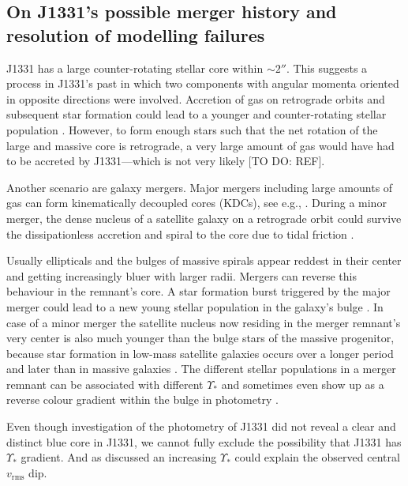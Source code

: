 \subsection{On J1331's possible merger history and resolution of modelling failures}

J1331 has a large counter-rotating stellar core within $\sim 2''$. This suggests a process in J1331's past in which two components with angular momenta oriented in opposite directions were involved. Accretion of gas on retrograde orbits and subsequent star formation could lead to a younger and counter-rotating stellar population \Wilma{[TO DO: REF]}. However, to form enough stars such that the net rotation of the large and massive core is retrograde, a very large amount of gas would have had to be accreted by J1331---which is not very likely [TO DO: REF]. 

Another scenario are galaxy mergers. Major mergers including large amounts of gas can form kinematically decoupled cores (KDCs), see e.g., . During a minor merger, the dense nucleus of a satellite galaxy on a retrograde orbit could survive the dissipationless accretion and spiral to the core due to tidal friction \citep{1984ApJ...287..577K}. 

Usually ellipticals and the bulges of massive spirals appear reddest in their center and getting increasingly bluer with larger radii. Mergers can reverse this behaviour in the remnant's core. A star formation burst triggered by the major merger could lead to a new young stellar population in the galaxy's bulge . In case of a minor merger the satellite nucleus now residing in the merger remnant's very center is also much younger than the bulge stars of the massive progenitor, because star formation in low-mass satellite galaxies occurs over a longer period and later than in massive galaxies \Wilma{[TO DO: REF]}. The different stellar populations in a merger remnant can be associated with different $\Upsilon_*$ and sometimes even show up as a reverse colour gradient within the bulge in photometry \Wilma{[TO DO: REF]}.

Even though investigation of the photometry of J1331 did not reveal a clear and distinct blue core in J1331, we cannot fully exclude the possibility that J1331 has $\Upsilon_*$ gradient. And as discussed \Wilma{[TO DO: Where???]} an increasing $\Upsilon_*$ could explain the observed central $v_\text{rms}$ dip.

